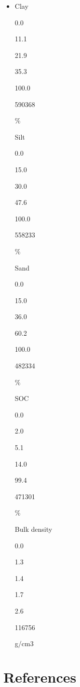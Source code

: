 \documentclass[
  10pt,
  b5paper,
  oneside]{book}
\begin{document}
\begin{itemize}
\item
  Clay

  0.0

  11.1

  21.9

  35.3

  100.0

  590368

  \%

  Silt

  0.0

  15.0

  30.0

  47.6

  100.0

  558233

  \%

  Sand

  0.0

  15.0

  36.0

  60.2

  100.0

  482334

  \%

  SOC

  0.0

  2.0

  5.1

  14.0

  99.4

  471301

  \%

  Bulk density

  0.0

  1.3

  1.4

  1.7

  2.6

  116756

  g/cm3
\end{itemize}

\hypertarget{references}{%
\chapter*{References}\label{references}}
\end{document}
